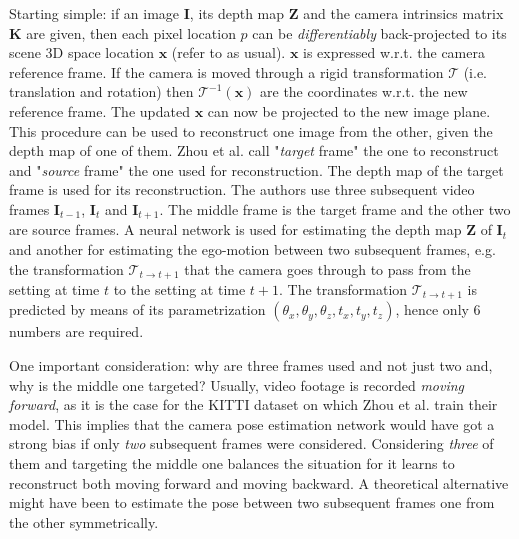Starting simple: if an image $\mathbf{I}$, its depth map $\mathbf{Z}$ and the camera intrinsics matrix $\mathbf{K}$ are given, then each pixel location $p$ can be \textit{differentiably} back-projected to its scene 3D space location $\mathbf{x}$ (refer to \cite{multiview} as usual).
$\mathbf{x}$ is expressed w.r.t. the camera reference frame.
If the camera is moved through a rigid transformation $\mathcal{T}$ (i.e. translation and rotation) then $\mathcal{T}^{-1} (\mathbf{x})$ are the coordinates w.r.t. the new reference frame.
The updated $\mathbf{x}$ can now be projected to the new image plane.
This procedure can be used to reconstruct one image from the other, given the depth map of one of them.
Zhou et al. call "\textit{target} frame" the one to reconstruct and "\textit{source} frame" the one used for reconstruction.
The depth map of the target frame is used for its reconstruction.
The authors use three subsequent video frames $\mathbf{I}_{t-1}$, $\mathbf{I}_{t}$ and $\mathbf{I}_{t+1}$.
The middle frame is the target frame and the other two are source frames.
A neural network is used for estimating the depth map $\mathbf{Z}$ of $\mathbf{I}_{t}$ and another for estimating the ego-motion between two subsequent frames, e.g. the transformation $\mathcal{T}_{t \rightarrow t+1}$ that the camera goes through to pass from the setting at time $t$ to the setting at time $t+1$.
The transformation $\mathcal{T}_{t \rightarrow t+1}$ is predicted by means of its parametrization $(\theta_{x}, \theta_{y}, \theta_{z}, t_{x}, t_{y}, t_{z})$, hence only 6 numbers are required.

One important consideration: why are three frames used and not just two and, why is the middle one targeted?
Usually, video footage is recorded \textit{moving forward}, as it is the case for the KITTI dataset on which Zhou et al. train their model.
This implies that the camera pose estimation network would have got a strong bias if only \textit{two} subsequent frames were considered.
Considering \textit{three} of them and targeting the middle one balances the situation for it learns to reconstruct both moving forward and moving backward.
A theoretical alternative might have been to estimate the pose between two subsequent frames one from the other symmetrically.

